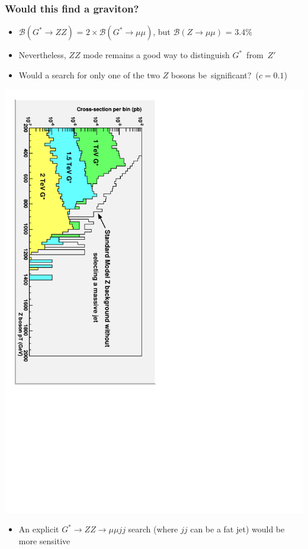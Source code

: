\documentclass[compress]{beamer}
\begin{document}
\begin{frame}
\frametitle{Would this find a graviton?}
\begin{itemize}
\item ${\mathcal B}(G^* \to ZZ)$ = $2 \times {\mathcal B}(G^* \to \mu\mu)$, but ${\mathcal B}(Z \to \mu\mu)$ = 3.4\%
\item Nevertheless, $ZZ$ mode remains a good way to distinguish \mbox{$G^*$ from $Z'$\hspace{-1 cm}}
\item Would a search for only one of the two $Z$ bosons \mbox{be significant? ($c=0.1$)\hspace{-1 cm}}
\end{itemize}

\includegraphics[height=\linewidth, angle=90]{gravitons_ideal.pdf}

\begin{itemize}
\item An explicit $G^* \to ZZ \to \mu\mu jj$ search (where $jj$ can be a fat jet) would be more sensitive
\end{itemize}
\end{frame}
\end{document}

